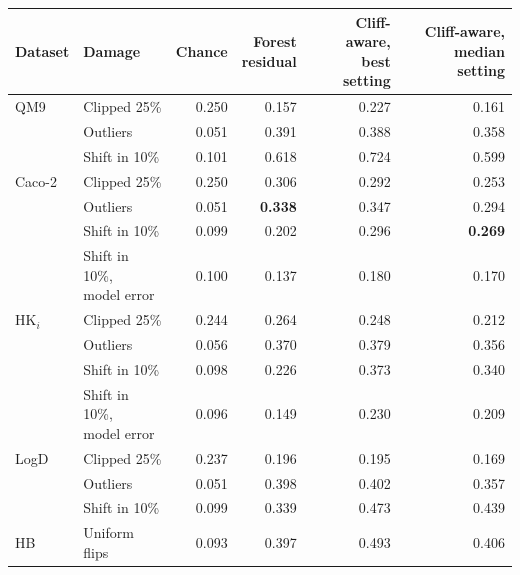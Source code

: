 \begin{table}[htbp]
\centering
\begin{tabular}{@{}llrrrr@{}}
\toprule
Dataset & Damage & Chance & \makecell[r]{Forest\\residual} & \makecell[r]{Cliff-aware,\\best setting} & \makecell[r]{Cliff-aware,\\median setting} \\
\midrule
QM9 & Clipped 25\% & 0.250 & 0.157 & 0.227 & 0.161 \\
 & Outliers & 0.051 & 0.391 & 0.388 & 0.358 \\
 & Shift in 10\% & 0.101 & 0.618 & 0.724 & 0.599 \\
Caco-2 & Clipped 25\% & 0.250 & 0.306 & 0.292 & 0.253 \\
 & Outliers & 0.051 & \textbf{0.338} & 0.347 & 0.294 \\
 & Shift in 10\% & 0.099 & 0.202 & 0.296 & \textbf{0.269} \\
 & \makecell[l]{Shift in 10\%,\\model error} &0.100 & 0.137 & 0.180 & 0.170 \\
HK$_i$ & Clipped 25\% & 0.244 & 0.264 & 0.248 & 0.212 \\
 & Outliers & 0.056 & 0.370 & 0.379 & 0.356 \\
 & Shift in 10\% & 0.098 & 0.226 & 0.373 & 0.340 \\
 & \makecell[l]{Shift in 10\%,\\model error} &0.096 & 0.149 & 0.230 & 0.209 \\
LogD & Clipped 25\% & 0.237 & 0.196 & 0.195 & 0.169 \\
 & Outliers & 0.051 & 0.398 & 0.402 & 0.357 \\
 & Shift in 10\% & 0.099 & 0.339 & 0.473 & 0.439 \\
HB & Uniform flips & 0.093 & 0.397 & 0.493 & 0.406 \\

\end{tabular}
\end{table}
